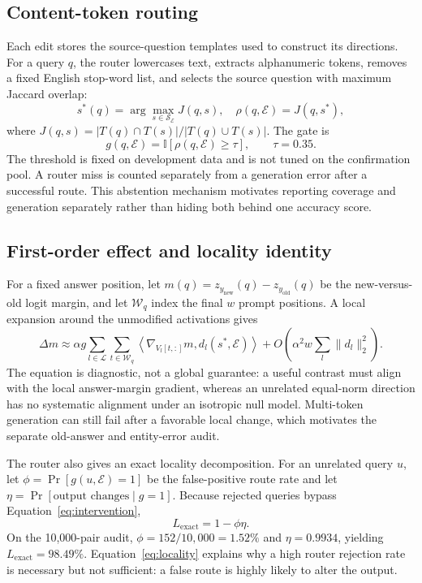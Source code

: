\documentclass{article}
\newcommand{\newans}{y_{\mathrm{new}}}
\newcommand{\oldans}{y_{\mathrm{old}}}
\begin{document}
\subsection{Content-token routing}
Each edit stores the source-question templates used to construct its directions. For a query $q$, the router lowercases text, extracts alphanumeric tokens, removes a fixed English stop-word list, and selects the source question with maximum Jaccard overlap:
\begin{equation}
    s^*(q)=\arg\max_{s\in\mathcal{S}_{\mathcal E}}J(q,s),\quad
    \rho(q,\mathcal{E})=J(q,s^*),
\end{equation}
where $J(q,s)=|T(q)\cap T(s)|/|T(q)\cup T(s)|$.
The gate is
\begin{equation}
    g(q,\mathcal{E})=\mathbb{I}[\rho(q,\mathcal{E})\geq\tau], \qquad \tau=0.35.
    \label{eq:gate}
\end{equation}
The threshold is fixed on development data and is not tuned on the confirmation pool. A router miss is counted separately from a generation error after a successful route. This abstention mechanism motivates reporting coverage and generation separately rather than hiding both behind one accuracy score.

\subsection{First-order effect and locality identity}
For a fixed answer position, let $m(q)=z_{\newans}(q)-z_{\oldans}(q)$ be the new-versus-old logit margin, and let $\mathcal W_q$ index the final $w$ prompt positions. A local expansion around the unmodified activations gives
\begin{equation}
    \Delta m \approx \alpha g\sum_{l\in\mathcal{L}}
    \sum_{t\in\mathcal W_q}\!\left\langle
    \nabla_{V_l[t,:]}m,d_l(s^*,\mathcal{E})\right\rangle
    +O\!\left(\alpha^2w\sum_l\|d_l\|_2^2\right).
    \label{eq:margin}
\end{equation}
The equation is diagnostic, not a global guarantee: a useful contrast must align with the local answer-margin gradient, whereas an unrelated equal-norm direction has no systematic alignment under an isotropic null model. Multi-token generation can still fail after a favorable local change, which motivates the separate old-answer and entity-error audit.

The router also gives an exact locality decomposition. For an unrelated query $u$, let $\phi=\Pr[g(u,\mathcal{E})=1]$ be the false-positive route rate and let $\eta=\Pr[\text{output changes}\mid g=1]$. Because rejected queries bypass Equation~\ref{eq:intervention},
\begin{equation}
    L_{\mathrm{exact}}=1-\phi\eta.
    \label{eq:locality}
\end{equation}
On the 10,000-pair audit, $\phi=152/10{,}000=1.52\%$ and $\eta=0.9934$, yielding $L_{\mathrm{exact}}=98.49\%$. Equation~\ref{eq:locality} explains why a high router rejection rate is necessary but not sufficient: a false route is highly likely to alter the output.
\end{document}
